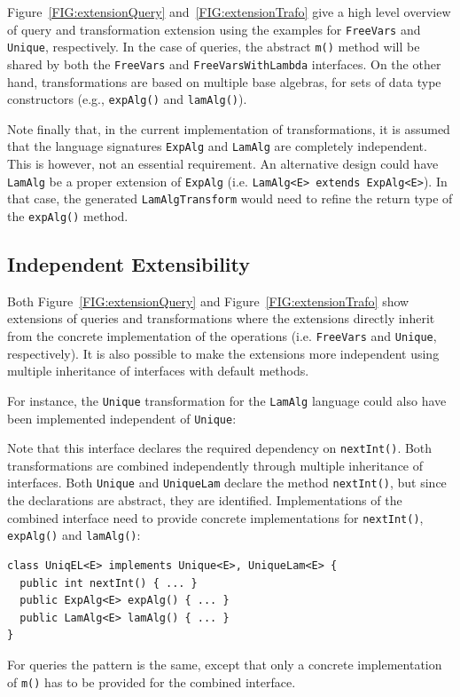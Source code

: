 Figure~\ref{FIG:extensionQuery} and~\ref{FIG:extensionTrafo} give a high level overview of query and transformation extension using the examples for {\small\texttt{FreeVars}} and \lstinline{Unique}, respectively.
In the case of queries, the abstract \lstinline{m()} method will be shared by both the \lstinline{FreeVars} and \lstinline{FreeVarsWithLambda} interfaces.
On the other hand, transformations are based on multiple base algebras, for sets of data type constructors (e.g., \lstinline{expAlg()} and \lstinline{lamAlg()}).

Note finally that, in the current implementation of \name transformations, it is assumed that the language signatures \lstinline{ExpAlg} and \lstinline{LamAlg} are completely independent.
This is however, not an essential requirement.
An alternative design could have \lstinline{LamAlg} be a proper extension of \lstinline{ExpAlg} (i.e. \lstinline{LamAlg<E> extends ExpAlg<E>}).
In that case, the generated \lstinline{LamAlgTransform} would need to refine the return type of the \lstinline{expAlg()} method.

\subsection{Independent Extensibility}

Both Figure~\ref{FIG:extensionQuery} and Figure~\ref{FIG:extensionTrafo} show extensions of queries and transformations where the extensions directly inherit from the concrete implementation of the operations (i.e. {\small\texttt{FreeVars}} and \lstinline{Unique}, respectively). It is also possible to make the extensions more independent using multiple inheritance of interfaces with default methods. 

For instance, the \lstinline{Unique} transformation for the \lstinline{LamAlg} language could also have been implemented independent of \lstinline{Unique}:


Note that this interface declares the required dependency on \lstinline{nextInt()}.
Both transformations are combined independently through multiple inheritance of interfaces.
Both \lstinline{Unique} and \lstinline{UniqueLam} declare the method \lstinline{nextInt()}, but since the declarations are abstract, they are identified. Implementations of the combined interface need to provide concrete implementations for \lstinline{nextInt()}, \lstinline{expAlg()} and \lstinline{lamAlg()}:

\begin{lstlisting}
class UniqEL<E> implements Unique<E>, UniqueLam<E> {
  public int nextInt() { ... }
  public ExpAlg<E> expAlg() { ... }
  public LamAlg<E> lamAlg() { ... }
}
\end{lstlisting}

For queries the pattern is the same, except that only a concrete implementation of \lstinline{m()} has to be provided for the combined interface. 
